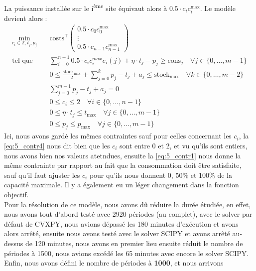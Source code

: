 \documentclass{article}
\begin{document}
\noindent La puissance installée sur le i\textsuperscript{ème} site équivaut alors à $0.5 \cdot c_ic_i^\mathrm{max}$. Le modèle devient alors :
\begin{align}
    \min_{c_{i} \in \mathbb{Z},t_j,p_j} \quad &\mathrm{costs}^\intercal 
    \begin{pmatrix}
        0.5 \cdot c_0c_0^\mathrm{max}\\
        \vdots\\
        0.5 \cdot c_{n-1}c_{n-1}^\mathrm{max}
    \end{pmatrix} \nonumber\\
    \textrm{tel que} \quad & \sum_{i=0}^{n-1} 0.5 \cdot c_ic_i^{max} e_i(j) + \eta \cdot t_j - p_j \ge \mathrm{cons}_j \quad \forall j \in  \{ 0, \ldots, m-1 \}\label{eq:5_contr1}\\
    & 0 \le \frac{\mathrm{stock}_\mathrm{max}}{2}  + \sum_{j=0}^{k} p_j - t_j + a_j \le  \mathrm{stock}_\mathrm{max} \quad \forall k \in \{ 0, \ldots, m-2 \}\label{eq:5_contr2}\\
    & \sum_{j=0}^{m-1} p_j - t_j + a_j = 0 \label{eq:5_contr3}\\
    & 0\le c_i \le 2 \quad \forall i \in  \{ 0, \ldots, n-1 \} \label{eq:5_contr4}  \\
    & 0 \le \eta \cdot t_j \le  t_\mathrm{max} \quad \forall j \in  \{ 0, \ldots, m-1 \} \label{eq:5_contr5}\\
    & 0 \le p_j \le  p_\mathrm{max} \quad \forall j \in  \{ 0, \ldots, m-1 \} \label{eq:5_contr6} 
\end{align}
Ici, nous avons gardé les mêmes contraintes sauf pour celles concernant les $c_i$, la \eqref{eq:5_contr4} nous dit bien
que les $c_i$ sont entre 0 et 2, et vu qu'ils sont entiers, nous avons bien nos valeurs atetndues, ensuite la \eqref{eq:5_contr1}
nous donne la même contrainte par rapport au fait que la consommation doit être satisfaite, sauf qu'il faut ajuster
les $c_i$ pour qu'ils nous donnent 0, 50\% et 100\% de la capacité maximale. Il y a également eu un léger changement dans la 
fonction objectif. \\
Pour la résolution de ce modèle, nous avons dû réduire la durée étudiée, en effet, nous avons tout d'abord
testé avec 2920 périodes (au complet), avec le solver par défaut de CVXPY, nous avions dépassé les 180 minutes
d'exécution et avons alors arrêté, ensuite nous avons testé avec le solver SCIPY et avons arrêté au-dessus de 120
minutes, nous avons en premier lieu ensuite réduit le nombre de périodes à 1500, nous avions excédé les 65
minutes avec encore le solver SCIPY. Enfin, nous avons défini le nombre de périodes à \textbf{1000}, et nous arrivons
\end{document}
